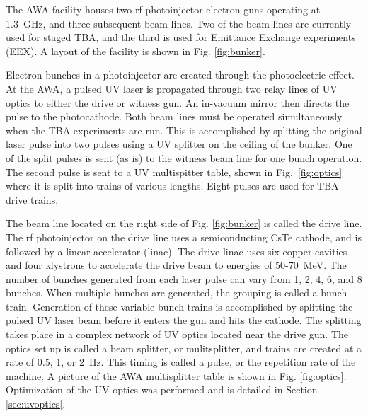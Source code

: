 The AWA facility houses two rf photoinjector electron guns operating
at \SI{1.3}{GHz}, and three subsequent beam lines. 
Two of the beam lines are currently used for staged TBA, and the
third is used for Emittance Exchange experiments (EEX). A layout of
the facility is shown in Fig. \ref{fig:bunker}. 

Electron bunches in a photoinjector are created through the photoelectric effect. 
At the AWA, a pulsed UV laser is propagated through two relay lines of UV optics to either
the drive or witness gun. An in-vacuum mirror then directs the pulse to the photocathode.
Both beam lines must be operated simultaneously when the TBA experiments are run. This is accomplished by
splitting the original laser pulse into two pulses using a UV splitter on the 
ceiling of the bunker. One of the split pulses is sent (as is) to the witness beam line for one
bunch operation. The second pulse is sent to a UV multispitter table, shown in 
Fig.~\ref{fig:optics} where it is split into trains of various lengths. Eight pulses are 
used for TBA drive trains, 

The beam line located on the right side of Fig. \ref{fig:bunker} is called the
drive line. The rf photoinjector on the drive line uses a semiconducting
CsTe cathode, and is followed by a linear accelerator (linac). The
drive linac uses six copper cavities and four klystrons to accelerate the drive beam
to energies of 50-\SI{70}{MeV}. The number of bunches generated from each 
laser pulse can vary from 1, 2, 4, 6, and 8 bunches. When multiple bunches
are generated, the grouping is called a bunch train. Generation of
these variable bunch trains is accomplished by splitting the pulsed
UV laser beam before it enters the gun and hits the cathode. The splitting
takes place in a complex network of UV optics located near the drive
gun. The optics set up is called a beam splitter, or mulitsplitter,
and trains are created at a rate of 0.5, 1, or \SI{2}{Hz}. This timing is
called a pulse, or the repetition rate of the machine. A picture of
the AWA multisplitter table is shown in Fig. \ref{fig:optics}. Optimization 
of the UV optics was performed and is detailed in Section \ref{sec:uvoptics}.  

